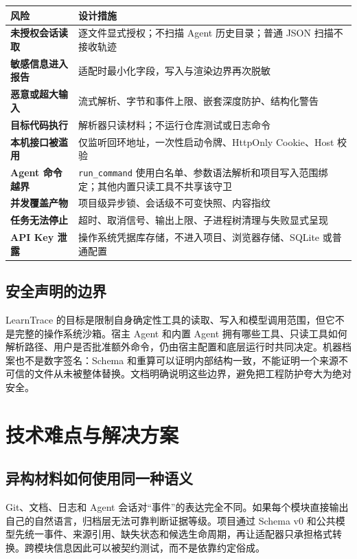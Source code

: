 \documentclass[UTF8,a4paper,12pt]{ctexart}
\begin{document}
\begin{center}
\small
\begin{tabularx}{\textwidth}{>{\bfseries}p{}X}
\toprule
风险 & 设计措施 \\
\midrule
未授权会话读取 & 逐文件显式授权；不扫描 Agent 历史目录；普通 JSON 扫描不接收轨迹 \\
敏感信息进入报告 & 适配时最小化字段，写入与渲染边界再次脱敏 \\
恶意或超大输入 & 流式解析、字节和事件上限、嵌套深度防护、结构化警告 \\
目标代码执行 & 解析器只读材料；不运行仓库测试或日志命令 \\
本机接口被滥用 & 仅监听回环地址，一次性启动令牌、HttpOnly Cookie、Host 校验 \\
Agent 命令越界 & \texttt{run\_command} 使用白名单、参数语法解析和项目写入范围绑定；其他内置只读工具不共享该守卫 \\
并发覆盖产物 & 项目级异步锁、会话级不可变快照、内容指纹 \\
任务无法停止 & 超时、取消信号、输出上限、子进程树清理与失败显式呈现 \\
API Key 泄露 & 操作系统凭据库存储，不进入项目、浏览器存储、SQLite 或普通配置 \\
\bottomrule
\end{tabularx}
\end{center}

\subsection{安全声明的边界}

LearnTrace 的目标是限制自身确定性工具的读取、写入和模型调用范围，但它不是完整的操作系统沙箱。宿主 Agent 和内置 Agent 拥有哪些工具、只读工具如何解析路径、用户是否批准额外命令，仍由宿主配置和底层运行时共同决定。机器档案也不是数字签名：Schema 和重算可以证明内部结构一致，不能证明一个来源不可信的文件从未被整体替换。文档明确说明这些边界，避免把工程防护夸大为绝对安全。

\section{技术难点与解决方案}

\subsection{异构材料如何使用同一种语义}

Git、文档、日志和 Agent 会话对“事件”的表达完全不同。如果每个模块直接输出自己的自然语言，归档层无法可靠判断证据等级。项目通过 Schema v0 和公共模型先统一事件、来源引用、缺失状态和候选生命周期，再让适配器只承担格式转换。跨模块信息因此可以被契约测试，而不是依靠约定俗成。
\end{document}
